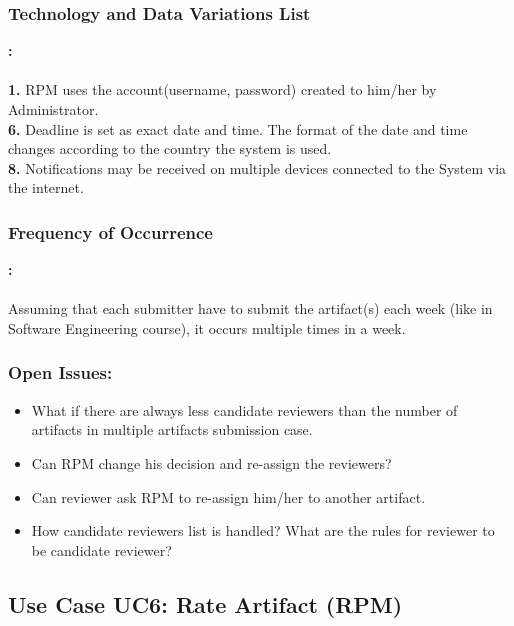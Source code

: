 \newpage
     \subsubsection*{Technology and Data Variations List}\textbf{:}
     \\
     \\
     \textbf{1.} RPM uses the account(username, password) created to him/her by Administrator.
     \\
     \textbf{6.} Deadline is set as exact date and time.  The format of the date and time changes according to the country the system is used.
     \\
     \textbf{8.} Notifications may be received on multiple devices connected to the System via the internet.
     
     \subsubsection*{Frequency of Occurrence}\textbf{:}
     \\
     \\
     Assuming that each submitter have to submit the artifact(s) each week (like in Software Engineering course), it occurs multiple times in a week.
     
     
     
     \subsubsection*{Open Issues:}
    \begin{itemize}
    \itemsep-1em 
       \item What if there are always less candidate reviewers than the number of artifacts in multiple artifacts submission case.
       \item Can RPM change his decision and re-assign the reviewers?
       \item  Can reviewer ask RPM to re-assign him/her to another artifact.
       \item  How candidate reviewers list is handled?  What are the rules for reviewer to be candidate reviewer?
    \end{itemize}
    
    
    
    
    \subsection*{Use Case UC6: Rate Artifact (RPM)}

